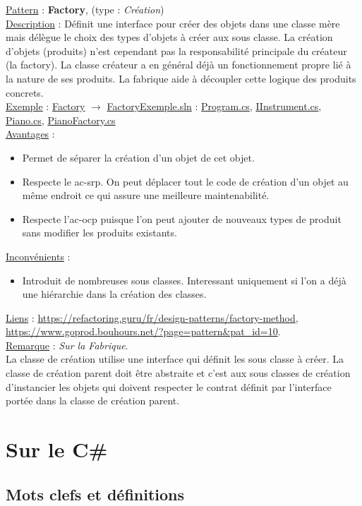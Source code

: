 \documentclass[a4paper,12pt,twoside]{article}
\newcommand{\exemplepath}{../Exercices}
\newcommand{\urlcolor}{magenta}  %
\newcommand{\foldercolor}{orange} %
\newcommand{\cscolor}{green!60!black} %
\newcommand{\slncolor}{violet} %
\newcommand{\rem}[2]{\noindent\underline{Remarque} : \textit{#1}.\\ \indent #2}
\newcommand{\csref}[2]{\hypersetup{urlcolor=\cscolor}\href{file:\exemplepath /#1.cs}{#2.cs}\hypersetup{urlcolor=\urlcolor}}
\newcommand{\slnref}[2]{\hypersetup{urlcolor=\slncolor}\href{file:\exemplepath /#1.sln}{#2.sln}\hypersetup{urlcolor=\urlcolor}}
\newcommand{\folderref}[2]{\hypersetup{urlcolor=\foldercolor}\href{file:\exemplepath /#1/.}{#2}\hypersetup{urlcolor=\urlcolor}}
\newcommand{\dpat}[7]{
\noindent \underline{Pattern} : \textbf{#1}, \indent (type : \textit{#2}) \\
\underline{Description} : \indent #3 \\
\underline{Exemple} : \indent #4 \\
\noindent \underline{Avantages} : 
\begin{itemize}
 #5
\end{itemize}
\noindent \underline{Inconvénients} : 
\begin{itemize}
 #6 
\end{itemize}
\underline{Liens} : #7 
}
\begin{document}
\dpat{Factory}
{Création}
{Définit une interface pour créer des objets dans une classe mère mais délègue le choix des types d'objets à créer aux sous classe. La création d'objets (produits) n’est cependant pas la responsabilité principale du créateur (la factory). La classe créateur a en général déjà un fonctionnement propre lié à la nature de ses produits. La fabrique aide à découpler cette logique des produits concrets.}
{\folderref{Factory}{Factory} $\to$ \slnref{Factory/FactoryExemple}{FactoryExemple} : \indent \csref{Factory/FactoryExermple/Program}{Program}, \csref{Factory/FactoryExemple/IInstrument}{IInstrument}, \csref{Factory/FactoryExemple/Piano}{Piano}, \csref{Factory/FactoryExemple/PianoFactory}{PianoFactory}}
{\item Permet de séparer la création d'un objet de cet objet.
\item Respecte le \gls{ac-srp}. On peut déplacer tout le code de création d'un objet au même endroit ce qui assure une meilleure maintenabilité.
\item Respecte l'\gls{ac-ocp} puisque l'on peut ajouter de nouveaux types de produit sans modifier les produits existants.}
{\item Introduit de nombreuses sous classes. Interessant uniquement si l'on a déjà une hiérarchie dans la création des classes.}
{\url{https://refactoring.guru/fr/design-patterns/factory-method}, \\ \url{https://www.goprod.bouhours.net/?page=pattern&pat_id=10}.} \\

\rem{Sur la Fabrique}{La classe de création utilise une interface qui définit les sous classe à créer. La classe de création parent doit être abstraite et c'est aux sous classes de création d'instancier les objets qui doivent respecter le contrat définit par l'interface portée dans la classe de création parent.}


\section{Sur le C\#}

\subsection{Mots clefs et définitions}
\end{document}
